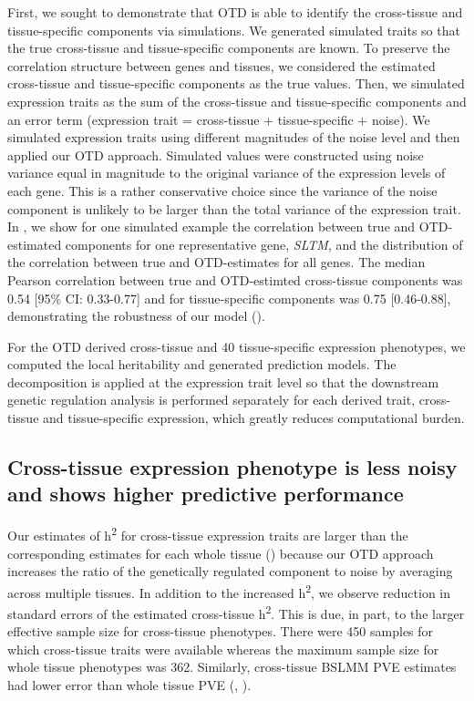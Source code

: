 \documentclass[10pt,letterpaper]{article}
\begin{document}
First, we sought to demonstrate that OTD is able to identify the cross-tissue and tissue-specific components via simulations. We generated simulated traits so that the true cross-tissue and tissue-specific components are known. To preserve the correlation structure between genes and tissues, we considered the estimated cross-tissue and tissue-specific components as the true values. Then, we simulated expression traits as the sum of the cross-tissue and tissue-specific components and an error term (expression trait = cross-tissue + tissue-specific + noise). We simulated expression traits using different magnitudes of the noise level and then applied our OTD approach. Simulated values were constructed using noise variance equal in magnitude to the original variance of the expression levels of each gene. This is a rather conservative choice since the variance of the noise component is unlikely to be larger than the total variance of the expression trait.
In , we show for one simulated example the correlation between true and OTD-estimated components for one representative gene, \textit{SLTM}, and the distribution of the correlation between true and OTD-estimates for all genes. The median Pearson correlation between true and OTD-estimted cross-tissue components was 0.54 [95\% CI: 0.33-0.77] and for tissue-specific components was 0.75 [0.46-0.88], demonstrating the robustness of our model ().

For the OTD derived cross-tissue and 40 tissue-specific expression phenotypes, we computed the local heritability and generated prediction models.
The decomposition is applied at the expression trait level so that the downstream genetic regulation analysis is performed separately for each derived trait, cross-tissue and tissue-specific expression, which greatly reduces computational burden. 

\subsection*{Cross-tissue expression phenotype is less noisy and shows higher predictive performance}%

Our estimates of h\textsuperscript{2} for cross-tissue expression traits are larger than the corresponding estimates for each whole tissue () because our OTD approach increases the ratio of the genetically regulated component to noise by averaging across multiple tissues. In addition to the increased h\textsuperscript{2}, we observe reduction in standard errors of the estimated cross-tissue h\textsuperscript{2}. This is due, in part, to the larger effective sample size for cross-tissue phenotypes. There were 450 samples for which cross-tissue traits were available whereas the maximum sample size for whole tissue phenotypes was 362. Similarly, cross-tissue BSLMM PVE estimates had lower error than whole tissue PVE (, ). 
\end{document}
